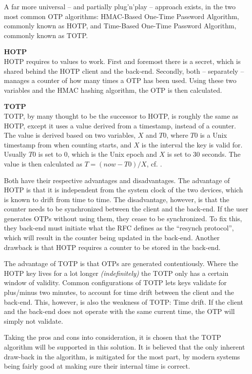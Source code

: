 				A far more universal -- and partially plug'n'play -- approach exists, in the two most common OTP algorithms: HMAC-Based One-Time Password Algorithm\cite{rfc4226}, commonly known as HOTP, and Time-Based One-Time Password Algorithm\cite{rfc6238}, commonly known as TOTP. 

				\textbf{HOTP}\\
				HOTP requires to values to work. First and foremost there is a secret, which is shared behind the HOTP client and the back-end. Secondly, both -- separately -- manages a counter of how many times a OTP has been used. Using these two variables and the HMAC hashing algorithm, the OTP is then calculated. 

				\textbf{TOTP}\\
				TOTP, by many thought to be the successor to HOTP, is roughly the same as HOTP, except it uses a value derived from a timestamp, instead of a counter. The value is derived based on two variables, $X$ and $T0$, where $T0$ is a Unix timestamp from when counting starts, and $X$ is the interval the key is valid for. Usually $T0$ is set to $0$, which is the Unix epoch and $X$ is set to $30$ seconds. The value is then calculated as $T = (now - T0)/X$, cf. \cite[Sec. 4.2]{rfc6238}.

				Both have their respective advantages and disadvantages. The advantage of HOTP is that it is independent from the system clock of the two devices, which is known to drift from time to time. The disadvantage, however, is that the counter needs to be synchronized between the client and the back-end. If the user generates OTPs without using them, they cease to be synchronized. To fix this, they back-end must initiate what the RFC defines as the ``resynch protocol'', which will result in the counter being updated in the back-end. Another drawback is that HOTP requires a counter to be stored in the back-end.

				The advantage of TOTP is that OTPs are generated contentiously. Where the HOTP key lives for a lot longer \emph{(indefinitely)} the TOTP only has a certain window of validity. Common configurations of TOTP lets keys validate for plus/minus two minutes, to account for time drift between the client and the back-end. This, however, is also the weakness of TOTP: Time drift. If the client and the back-end does not operate with the same current time, the OTP will simply not validate.

				Taking the pros and cons into consideration, it is chosen that the TOTP algorithm will be supported in this solution. It is believed that the only inherent draw-back in the algorithm, is mitigated for the most part, by modern systems being fairly good at making sure their internal time is correct.

